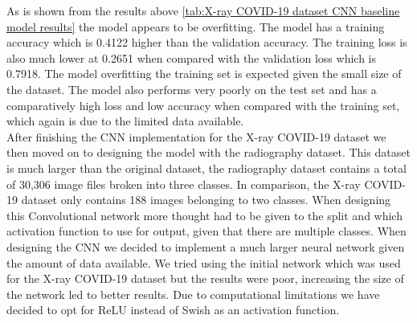As is shown from the results above \ref{tab:X-ray COVID-19 dataset CNN baseline model results} the model appears to be overfitting.  The model has a training accuracy which is 0.4122 higher than the validation accuracy.  The training loss is also much lower at 0.2651 when compared with the validation loss which is 0.7918.  The model overfitting the training set is expected given the small size of the dataset.  The model also performs very poorly on the test set and has a comparatively high loss and low accuracy when compared with the training set, which again is due to the limited data available.
\\
After finishing the CNN implementation for the X-ray COVID-19 dataset we then moved on to designing the model with the radiography dataset. This dataset is much larger than the original dataset, the radiography dataset contains a total of 30,306 image files broken into three classes.  In comparison, the X-ray COVID-19 dataset only contains 188 images belonging to two classes.  When designing this Convolutional network more thought had to be given to the split and which activation function to use for output, given that there are multiple classes.  When designing the CNN we decided to implement a much larger neural network given the amount of data available.  We tried using the initial network which was used for the X-ray COVID-19 dataset but the results were poor, increasing the size of the network led to better results.  Due to computational limitations we have decided to opt for ReLU instead of Swish as an activation function.
\begin{table}[H]
    \centering
    \caption{Radiography CNN baseline model architecture}
    \label{tab:Radiography CNN baseline model architecture}
\end{table}


